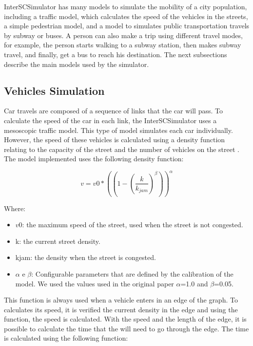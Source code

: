 InterSCSimulator has many models to simulate the mobility of a city population, including a traffic model, which calculates the speed of the vehicles in the streets, a simple pedestrian model, and a model to simulates public transportation travels by subway or buses. A person can also make a trip using different travel modes, for example, the person starts walking to a subway station, then makes subway travel, and finally, get a bus to reach his destination. The next subsections describe the main models used by the simulator.

\subsection{Vehicles Simulation}

Car travels are composed of a sequence of links that the car will pass. To calculate the speed of the car in each link, the InterSCSimulator uses a mesoscopic traffic model. This type of model simulates each car individually. However, the speed of these vehicles is calculated using a density function relating to the capacity of the street and the number of vehicles on the street \citep{song2017gpusimulation}. The model implemented uses the following density function:

\[
v=v0*(( 1 - ( \frac{k}{k_{jam}} ) ^ \beta ) ) ^ \alpha
\]

Where:

\begin{itemize}

\item $v0$: the maximum speed of the street, used when the street is not congested.
\item k: the current street density.
\item kjam: the density when the street is congested.
\item $\alpha$ e $\beta$: Configurable parameters that are defined by the calibration of the model. We used the values used in the original paper $\alpha$=1.0 and $\beta$=0.05. 

\end{itemize}

This function is always used when a vehicle enters in an edge of the graph. To calculates its speed, it is verified the current density in the edge and using the function, the speed is calculated. With the speed and the length of the edge, it is possible to calculate the time that the will need to go through the edge. The time is calculated using the following function:

